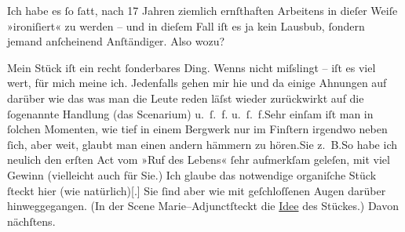 \pstart
           Ich habe es{ }ſo{ }ſatt, nach 17 Jahren ziemlich ernſthaften Arbeitens in dieſer Weiſe
               »ironiſiert« zu werden – und in dieſem Fall iſt es ja kein Lausbub,{ }ſondern jemand anſcheinend
               Anſtändiger. Also wozu?\pend
           
\pstart
           {\pb}Mein Stück iſt ein recht{ }ſonderbares Ding. Wenns
               nicht miſslingt – iſt es viel wert, für mich meine ich. Jedenfalls gehen mir hie und
               da einige Ahnungen auf darüber wie das was man die Leute reden läſst wieder
               zurückwirkt auf die{ }ſogenannte Handlung (das Scenarium) u. ſ. f. u. ſ. f.\hspace*{1.5em}Sehr einſam iſt man in{ }ſolchen Momenten, wie tief in
               einem Bergwerk nur im Finſtern {\pb}irgendwo neben{ }ſich, aber weit, glaubt man einen andern hämmern zu hören.\hspace*{1.5em}Sie z. B.\hspace*{1.5em}So habe ich
               neulich den erſten Act vom »Ruf des Lebens«{ }ſehr
               aufmerkſam geleſen, mit viel Gewinn (vielleicht auch für Sie.) Ich glaube das
               notwendige organiſche Stück{ }ſteckt hier (wie natürlich){[}.{]} Sie{ }ſind aber wie mit geſchloſſenen Augen darüber hinweggegangen. (In der Scene Marie–Adjunctſteckt die \uline{Idee} des
               Stückes.) Davon nächſtens.\pend
           

